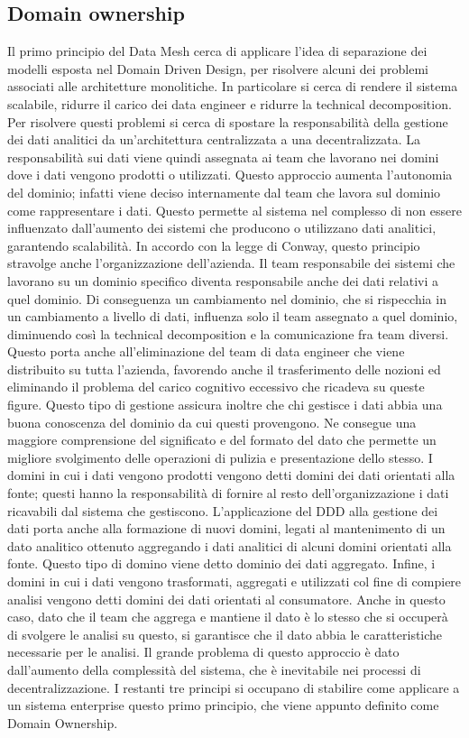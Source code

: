 \documentclass[a4paper,12pt]{report}
\begin{document}
\subsection{Domain ownership} \label{downership}
Il primo principio del Data Mesh cerca di applicare l'idea di separazione dei modelli esposta nel Domain Driven Design, per risolvere alcuni dei problemi associati alle architetture monolitiche.
In particolare si cerca di rendere il sistema scalabile, ridurre il carico dei data engineer e ridurre la technical decomposition.
Per risolvere questi problemi si cerca di spostare la responsabilità della gestione dei dati analitici da un'architettura centralizzata a una decentralizzata. 
La responsabilità sui dati viene quindi assegnata ai team che lavorano nei domini dove i dati vengono prodotti o utilizzati.
Questo approccio aumenta l'autonomia del dominio; infatti viene deciso internamente dal team che lavora sul dominio come rappresentare i dati.
Questo permette al sistema nel complesso di non essere influenzato dall'aumento dei sistemi che producono o utilizzano dati analitici, garantendo scalabilità.
In accordo con la legge di Conway, questo principio stravolge anche l'organizzazione dell'azienda.
Il team responsabile dei sistemi che lavorano su un dominio specifico diventa responsabile anche dei dati relativi a quel dominio.
Di conseguenza un cambiamento nel dominio, che si rispecchia in un cambiamento a livello di dati, influenza solo il team assegnato a quel dominio, diminuendo così la technical decomposition e la comunicazione fra team diversi.
Questo porta anche all'eliminazione del team di data engineer che viene distribuito su tutta l'azienda, favorendo anche il trasferimento delle nozioni ed eliminando il problema del carico cognitivo eccessivo che ricadeva su queste figure.
Questo tipo di gestione assicura inoltre che chi gestisce i dati abbia una buona conoscenza del dominio da cui questi provengono.
Ne consegue una maggiore comprensione del significato e del formato del dato che permette un migliore svolgimento delle operazioni di pulizia e presentazione dello stesso. 
I domini in cui i dati vengono prodotti vengono detti domini dei dati orientati alla fonte; questi hanno la responsabilità di fornire al resto dell'organizzazione i dati ricavabili dal sistema che gestiscono.
L'applicazione del DDD alla gestione dei dati porta anche alla formazione di nuovi domini, legati al mantenimento di un dato analitico ottenuto aggregando i dati analitici di alcuni domini orientati alla fonte.
Questo tipo di domino viene detto dominio dei dati aggregato.
Infine, i domini in cui i dati vengono trasformati, aggregati e utilizzati col fine di compiere analisi vengono detti domini dei dati orientati al consumatore. 
Anche in questo caso, dato che il team che aggrega e mantiene il dato è lo stesso che si occuperà di svolgere le analisi su questo, si garantisce che il dato abbia le caratteristiche necessarie per le analisi. 
Il grande problema di questo approccio è dato dall'aumento della complessità del sistema, che è inevitabile nei processi di decentralizzazione.
I restanti tre principi si occupano di stabilire come applicare a un sistema enterprise questo primo principio, che viene appunto definito come Domain Ownership.
\end{document}
